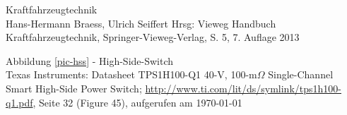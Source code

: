 \documentclass[a4paper,oneside,12pt]{report}
\begin{document}
\clearpage
{}
\begin{thebibliography}{9} 
	\vspace{1.0cm}
	
	 Kraftfahrzeugtechnik \\ Hans-Hermann Braess, Ulrich Seiffert Hrsg: \glqq Vieweg Handbuch Kraftfahrzeugtechnik\grqq, Springer-Vieweg-Verlag, S. 5, 7. Auflage 2013
		
	 Abbildung \ref{pic-hss} - High-Side-Switch\\ Texas Instruments: Datasheet TPS1H100-Q1 40-V, 100-m$\Omega$ Single-Channel Smart High-Side Power Switch; \newline \url{http://www.ti.com/lit/ds/symlink/tps1h100-q1.pdf}, Seite 32 (Figure 45), aufgerufen am \today

	
\end{thebibliography}
\end{document}
